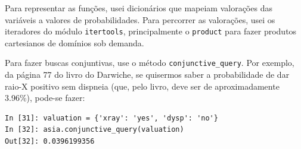 \documentclass[paper=a4, fontsize=11pt]{scrartcl} %
\numberwithin{equation}{subsection}
\numberwithin{figure}{subsection}
\numberwithin{table}{subsection}
\numberwithin{definition}{subsection}
\numberwithin{theorem}{subsection}
\numberwithin{property}{subsection}
\numberwithin{proposition}{subsection}
\numberwithin{equation}{section}
\numberwithin{figure}{section}
\numberwithin{table}{section}
\numberwithin{definition}{section}
\numberwithin{theorem}{section}
\numberwithin{property}{section}
\numberwithin{proposition}{section}
\begin{document}
Para representar as funções, usei dicionários que mapeiam valorações das variáveis a valores de probabilidades. Para percorrer as valorações, usei os iteradores do módulo \verb|itertools|, principalmente o \verb|product| para fazer produtos cartesianos de domínios sob demanda.

Para fazer buscas conjuntivas, use o método \verb|conjunctive_query|. Por exemplo, da página 77 do livro do Darwiche, se quisermos saber a probabilidade de dar raio-X positivo sem dispneia (que, pelo livro, deve ser de aproximadamente 3.96\%), pode-se fazer:

\begin{verbatim}
In [31]: valuation = {'xray': 'yes', 'dysp': 'no'}
In [32]: asia.conjunctive_query(valuation)
Out[32]: 0.0396199356
\end{verbatim} 
\end{document}
